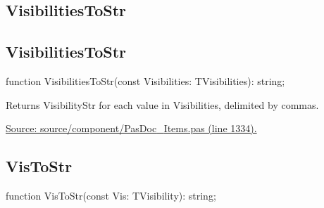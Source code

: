 \documentclass{report}
\newif\ifpdf
\begin{document}
\subsection*{\large{\textbf{VisibilitiesToStr}}\normalsize\hspace{1ex}\hrulefill}
\else
\subsection*{VisibilitiesToStr}
\fi
\label{PasDoc_Items-VisibilitiesToStr}
\begin{list}{}{
\setlength{\itemindent}{0cm}
\setlength{\listparindent}{0cm}
\setlength{\leftmargin}{\evensidemargin}
\addtolength{\leftmargin}{\tmplength}
\settowidth{\labelsep}{X}
\addtolength{\leftmargin}{\labelsep}
\setlength{\labelwidth}{\tmplength}
}
\item[\textbf{Declaration}\hfill]
\ifpdf
\begin{flushleft}
\fi
\begin{ttfamily}
function VisibilitiesToStr(const Visibilities: TVisibilities): string;\end{ttfamily}

\ifpdf
\end{flushleft}
\fi

\par
\item[\textbf{Description}]
Returns VisibilityStr for each value in Visibilities, delimited by commas.\par
\href{https://github.com/pasdoc/pasdoc/blob/master/source/component/PasDoc_Items.pas#L1334}{Source: source/component/PasDoc{\_}Items.pas (line 1334).}

\end{list}
\ifpdf
\subsection*{\large{\textbf{VisToStr}}\normalsize\hspace{1ex}\hrulefill}
\else
\subsection*{VisToStr}
\fi
\label{PasDoc_Items-VisToStr}
\begin{list}{}{
\setlength{\itemindent}{0cm}
\setlength{\listparindent}{0cm}
\setlength{\leftmargin}{\evensidemargin}
\addtolength{\leftmargin}{\tmplength}
\settowidth{\labelsep}{X}
\addtolength{\leftmargin}{\labelsep}
\setlength{\labelwidth}{\tmplength}
}
\item[\textbf{Declaration}\hfill]
\ifpdf
\begin{flushleft}
\fi
\begin{ttfamily}
function VisToStr(const Vis: TVisibility): string;\end{ttfamily}

\ifpdf
\end{flushleft}
\fi

\end{list}
\ifpdf
\end{document}
